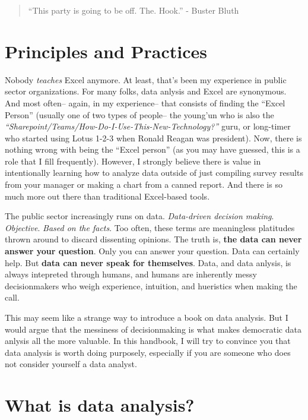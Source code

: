 \documentclass[]{book}
\begin{document}
\begin{quote}
``This party is going to be off. The. Hook.'' - Buster Bluth
\end{quote}

\hypertarget{principles-and-practices}{%
\section{Principles and Practices}\label{principles-and-practices}}

Nobody \emph{teaches} Excel anymore. At least, that's been my experience in public sector organizations. For many folks, data anlysis and Excel are synonymous. And most often-- again, in my experience-- that consists of finding the ``Excel Person'' (usually one of two types of people-- the young'un who is also the \emph{``Sharepoint/Teams/How-Do-I-Use-This-New-Technology?''} guru, or long-timer who started using Lotus 1-2-3 when Ronald Reagan was president). Now, there is nothing wrong with being the ``Excel person'' (as you may have guessed, this is a role that I fill frequently). However, I strongly believe there is value in intentionally learning how to analyze data outside of just compiling survey results from your manager or making a chart from a canned report. And there is so much more out there than traditional Excel-based tools.

The public sector increasingly runs on data. \emph{Data-driven decision making}. \emph{Objective}. \emph{Based on the facts}. Too often, these terms are meaningless platitudes thrown around to discard dissenting opinions. The truth is, \textbf{the data can never answer your question}. Only you can answer your question. Data can certainly help. But \textbf{data can never speak for themselves}. Data, and data anlysis, is always intepreted through humans, and humans are inherently messy decisionmakers who weigh experience, intuition, and hueristics when making the call.

This may seem like a strange way to introduce a book on data analysis. But I would argue that the messiness of decisionmaking is what makes democratic data anlysis all the more valuable. In this handbook, I will try to convince you that data analysis is worth doing purposely, especially if you are someone who does not consider yourself a data analyst.

\hypertarget{what-is-data-analysis}{%
\section{What is data analysis?}\label{what-is-data-analysis}}
\end{document}
